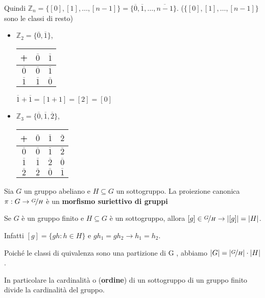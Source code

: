 \documentclass[../main.tex]{subfiles}
\begin{document}
\begin{example}
\begin{itemize}
              Quindi $\mathbb{Z}_n = \{[0],[1],\ldots,[n-1]\} = \{\overline{0}, \overline{1},\ldots,\overline{n - 1}\}$. ($\{[0],[1],\ldots,[n-1]\}$ sono le classi di resto)
              \begin{itemize}
                  \item $\mathbb{Z}_2 = \{\overline{0},\overline{1}\}$,
                        \begin{tabular}{c|c|c}
                            +              & $\overline{0}$ & $\overline{1}$ \\ \hline
                            $\overline{0}$ & $\overline{0}$ & $\overline{1}$ \\ \hline
                            $\overline{1}$ & $\overline{1}$ & $\overline{0}$ \\
                        \end{tabular}
                        $\overline{1} + \overline{1} = [1 + 1] = [2] = [0]$
                  \item $\mathbb{Z}_3 = \{\overline{0},\overline{1},\overline{2}\}$,
                        \begin{tabular}{c|c|c|c}
                            +              & $\overline{0}$ & $\overline{1}$ & $\overline{2}$ \\ \hline
                            $\overline{0}$ & $\overline{0}$ & $\overline{1}$ & $\overline{2}$ \\ \hline
                            $\overline{1}$ & $\overline{1}$ & $\overline{2}$ & $\overline{0}$ \\ \hline
                            $\overline{2}$ & $\overline{2}$ & $\overline{0}$ & $\overline{1}$ \\
                        \end{tabular}
              \end{itemize}
    \end{itemize}
\end{example}

\begin{definition}
    Sia $G$ un gruppo abeliano e $H \subseteq G$ un sottogruppo. La proiezione canonica $\pi : G \rightarrow \nicefrac{G}{H}$ è un \textbf{morfismo suriettivo di gruppi}
\end{definition}

Se $G$ è un gruppo finito e $H \subseteq G$ è un sottogruppo, allora $[g] \in \nicefrac{G}{H} \rightarrow |[g]| = |H|$.

Infatti $[g] = \{gh : h \in  H\}$ e $gh_1 = gh_2 \rightarrow h_1 = h_2$.

Poiché le classi di quivalenza sono una partizione di G , abbiamo $|G| = |\nicefrac{G}{H}| \cdot |H|$.

In particolare la cardinalità o (\textbf{ordine}) di un sottogruppo di un gruppo finito divide la cardinalità del gruppo.
\end{document}
